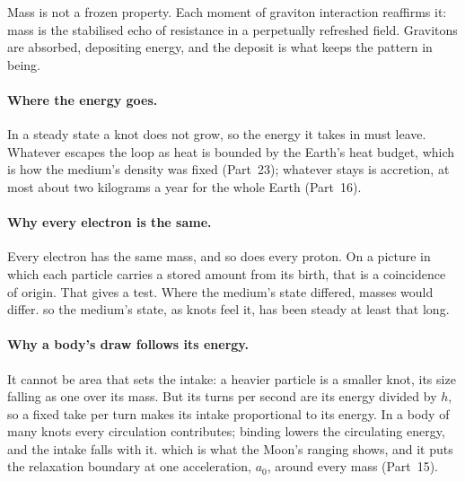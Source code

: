 \documentclass[11pt,a4paper]{article}
\begin{document}
Mass is not a frozen property. Each moment of graviton interaction reaffirms it: mass is the stabilised echo of resistance in a perpetually refreshed field. Gravitons are absorbed, depositing energy, and the deposit is what keeps the pattern in being.

\paragraph{Where the energy goes.} In a steady state a knot does not grow, so the energy it takes in must leave.  Whatever escapes the loop as heat is bounded by the Earth's heat budget, which is how the medium's density was fixed (Part~23); whatever stays is accretion, at most about two kilograms a year for the whole Earth (Part~16).

\paragraph{Why every electron is the same.} Every electron has the same mass, and so does every proton. On a picture in which each particle carries a stored amount from its birth, that is a coincidence of origin.  That gives a test. Where the medium's state differed, masses would differ.  so the medium's state, as knots feel it, has been steady at least that long.

\paragraph{Why a body's draw follows its energy.}  It cannot be area that sets the intake: a heavier particle is a smaller knot, its size falling as one over its mass. But its turns per second are its energy divided by $h$, so a fixed take per turn makes its intake proportional to its energy. In a body of many knots every circulation contributes; binding lowers the circulating energy, and the intake falls with it.  which is what the Moon's ranging shows, and it puts the relaxation boundary at one acceleration, $a_0$, around every mass (Part~15). 
\end{document}
